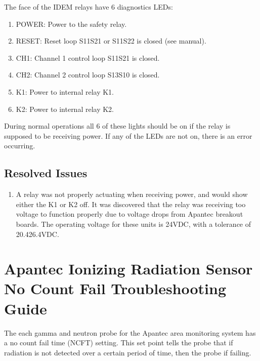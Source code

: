 \documentclass[letterpaper,10pt,english]{sphinxmanual}
\begin{document}
\sphinxAtStartPar
The face of the IDEM relays have 6 diagnostics LEDs:
\begin{enumerate}
%
\item {} 
\sphinxAtStartPar
POWER: Power to the safety relay.

\item {} 
\sphinxAtStartPar
RESET: Reset loop S11\sphinxhyphen{}S21 or S11\sphinxhyphen{}S22 is closed (see manual).

\item {} 
\sphinxAtStartPar
CH1: Channel 1 control loop S11\sphinxhyphen{}S21 is closed.

\item {} 
\sphinxAtStartPar
CH2: Channel 2 control loop S13\sphinxhyphen{}S10 is closed.

\item {} 
\sphinxAtStartPar
K1: Power to internal relay K1.

\item {} 
\sphinxAtStartPar
K2: Power to internal relay K2.

\end{enumerate}

\sphinxAtStartPar
During normal operations all 6 of these lights should be on if the relay is supposed to be receiving power.
If any of the LEDs are not on, there is an error occurring.




\subsection{Resolved Issues}
\label{\detokenize{troubleshooting_documentation/IDEM_relay:resolved-issues}}\begin{enumerate}
%
\item {} 
\sphinxAtStartPar
A relay was not properly actuating when receiving power, and would show either the K1 or K2 off.
It was discovered that the relay was receiving too voltage to function properly due to voltage drops from Apantec breakout boards.
The operating voltage for these units is 24VDC, with a tolerance of 20.4\sphinxhyphen{}26.4VDC.

\end{enumerate}

\sphinxstepscope


\section{Apantec Ionizing Radiation Sensor No Count Fail Troubleshooting Guide}
\label{\detokenize{troubleshooting_documentation/apantec_ncf:apantec-ionizing-radiation-sensor-no-count-fail-troubleshooting-guide}}\label{\detokenize{troubleshooting_documentation/apantec_ncf::doc}}
\sphinxAtStartPar
The each gamma and neutron probe for the Apantec area monitoring system has a no count fail time (NCFT) setting.
This set point tells the probe that if radiation is not detected over a certain period of time, then the probe if failing.
\end{document}

